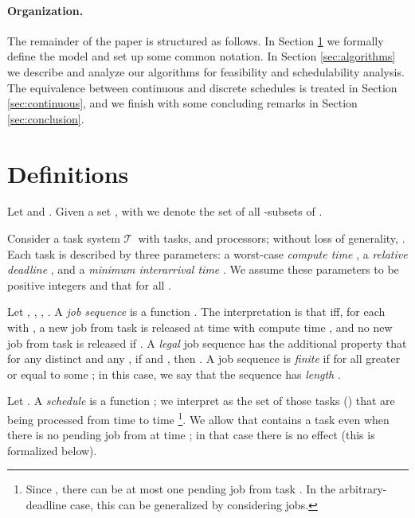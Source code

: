 \documentclass{llncs}
\newcommand{\tsys}{\ensuremath{\mathcal{T}}}
\begin{document}
\paragraph{Organization.} The remainder of the paper is structured as follows. In Section \ref{sec:definitions} we formally define the model and set up some common notation. In Section \ref{sec:algorithms} we describe and analyze our algorithms for feasibility and schedulability analysis. The equivalence between continuous and discrete schedules is treated in Section \ref{sec:continuous}, and we finish with some concluding remarks in Section \ref{sec:conclusion}. 

\section{Definitions}
\label{sec:definitions}


Let  and . 
Given a set , with  we denote the set of all -subsets of . 

Consider a task system \tsys\ with  tasks, and  processors; without loss of generality, . Each task  is described by three parameters: a worst-case \emph{compute time} , a \emph{relative deadline} , and a \emph{minimum interarrival time} . We assume these parameters to be positive integers and that  for all .  


\newcommand{\rct}{\ensuremath{\mathbf{C}}}
\newcommand{\ttd}{\ensuremath{\mathbf{D}}}
\newcommand{\tta}{\ensuremath{\mathbf{P}}}
\newcommand{\zero}{\ensuremath{\mathbf{0}}}
\newcommand{\scheddec}{\ensuremath{\mathbf{S}}}
\newcommand{\alg}{\ensuremath{\mathrm{Alg}}}

Let , , , . 
A \emph{job sequence} is a function . The interpretation is that  iff, for each  with , a new job from task  is released at time  with compute time , and no new job from task  is released if . A \emph{legal} job sequence has the additional property that for any distinct  and any , if  and , then . A job sequence is \emph{finite} if  for all  greater or equal to some ; in this case, we say that the sequence has \emph{length} . 

Let . A \emph{schedule} is a function ; we interpret  as the set of those  tasks () that are being processed from time  to time  \footnote{Since , there can be at most one pending job from task . In the arbitrary-deadline case, this can be generalized by considering  jobs.}. We allow that  contains a task  even when there is no pending job from  at time ; in that case there is no effect (this is formalized below). 
\end{document}
